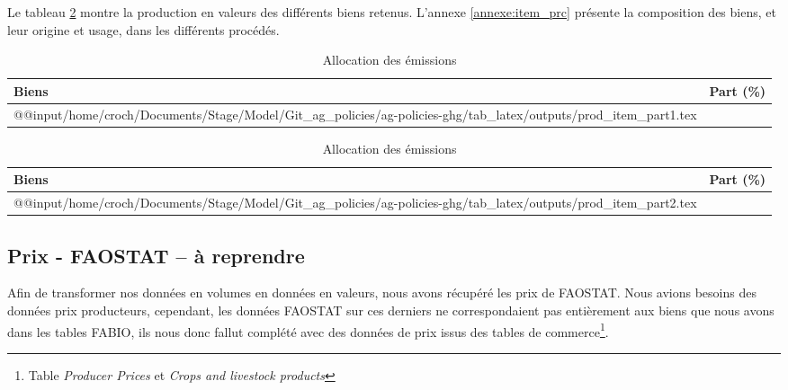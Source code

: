 Le tableau \ref{tab:prod_item} montre la production en valeurs des différents biens retenus. L'annexe \ref{annexe:item_prc} présente la composition des biens, et leur origine et usage, dans les différents procédés.


\begin{table}[h]
    \centering
    \begin{threeparttable}
        \begin{minipage}[t]{0.49\textwidth}
            \centering
            \begin{tabularx}{\textwidth}{p{1.8in}c}
                \textbf{Biens} & \textbf{Part (\%)} \\ \hline
                \csname @@input\endcsname /home/croch/Documents/Stage/Model/Git_ag_policies/ag-policies-ghg/tab_latex/outputs/prod_item_part1.tex
                \hline
            \end{tabularx}
        \end{minipage}
        \begin{minipage}[t]{0.49\textwidth}
            \centering
            \begin{tabularx}{\textwidth}{p{2in}c}
                \textbf{Biens} & \textbf{Part (\%)}                                                                                               \\ \hline
                \csname @@input\endcsname /home/croch/Documents/Stage/Model/Git_ag_policies/ag-policies-ghg/tab_latex/outputs/prod_item_part2.tex \\
                \hline
            \end{tabularx}
        \end{minipage}
        \caption{Allocation des émissions}
        \label{tab:prod_item}
    \end{threeparttable}
\end{table}


\subsection{Prix - FAOSTAT \textbf{-- à reprendre}}\label{subsec:prix}

Afin de transformer nos données en volumes en données en valeurs, nous avons récupéré les prix de FAOSTAT. Nous avions besoins des données prix producteurs, cependant, les données FAOSTAT sur ces derniers ne correspondaient pas entièrement aux biens que nous avons dans les tables FABIO, ils nous donc fallut complété avec des données de prix issus des tables de commerce\footnote{Table \textit{Producer Prices} et \textit{Crops and livestock products}}.


